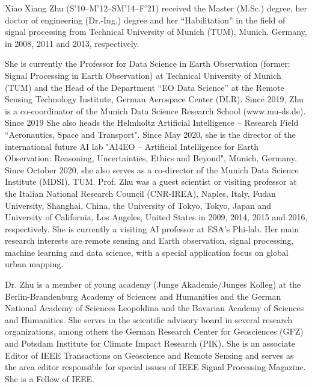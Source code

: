 \documentclass[journal]{IEEEtran}
\begin{document}
\begin{IEEEbiography}{Xiao Xiang Zhu}
(S'10--M'12--SM'14--F'21) received the Master (M.Sc.) degree, her doctor of engineering (Dr.-Ing.) degree and her “Habilitation” in the field of signal processing from Technical University of Munich (TUM), Munich, Germany, in 2008, 2011 and 2013, respectively.
\par
She is currently the Professor for Data Science in Earth Observation (former: Signal Processing in Earth Observation) at Technical University of Munich (TUM) and the Head of the Department ``EO Data Science'' at the Remote Sensing Technology Institute, German Aerospace Center (DLR). Since 2019, Zhu is a co-coordinator of the Munich Data Science Research School (www.mu-ds.de). Since 2019 She also heads the Helmholtz Artificial Intelligence -- Research Field ``Aeronautics, Space and Transport". Since May 2020, she is the director of the international future AI lab "AI4EO -- Artificial Intelligence for Earth Observation: Reasoning, Uncertainties, Ethics and Beyond", Munich, Germany. Since October 2020, she also serves as a co-director of the Munich Data Science Institute (MDSI), TUM. Prof. Zhu was a guest scientist or visiting professor at the Italian National Research Council (CNR-IREA), Naples, Italy, Fudan University, Shanghai, China, the University  of Tokyo, Tokyo, Japan and University of California, Los Angeles, United States in 2009, 2014, 2015 and 2016, respectively. She is currently a visiting AI professor at ESA's Phi-lab. Her main research interests are remote sensing and Earth observation, signal processing, machine learning and data science, with a special application focus on global urban mapping.

Dr. Zhu is a member of young academy (Junge Akademie/Junges Kolleg) at the Berlin-Brandenburg Academy of Sciences and Humanities and the German National  Academy of Sciences Leopoldina and the Bavarian Academy of Sciences and Humanities. She serves in the scientific advisory board in several research organizations, among others the German Research Center for Geosciences (GFZ) and Potsdam Institute for Climate Impact Research (PIK). She is an associate Editor of IEEE Transactions on Geoscience and Remote Sensing and serves as the area editor responsible for special issues of IEEE Signal Processing Magazine. She is a Fellow of IEEE.
 \end{IEEEbiography}
\end{document}
